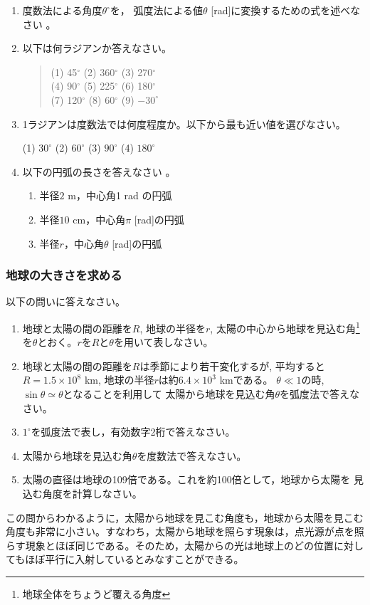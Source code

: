 \documentclass[twocolumn,11pt]{jarticle}
\begin{document}
\begin{enumerate}
\item 度数法による角度$\theta^\circ$を，
  弧度法による値$\theta$ [rad]に変換するための式を述べなさい
。
\item 以下は何ラジアンか答えなさい。
  \begin{quote}
    (1) 45$^\circ$\quad
    (2) 360$^\circ$\quad
    (3) 270$^\circ$\\
    (4) 90$^\circ$\quad
    (5) 225$^\circ$\quad
    (6) 180$^\circ$\\
    (7) 120$^\circ$\quad
    (8) 60$^\circ$\quad
    (9) $-30^\circ$\quad
  \end{quote}
\item 1ラジアンは度数法では何度程度か。以下から最も近い値を選びなさい。
  \begin{center}
    (1) $30^\circ$\quad
    (2) $60^\circ$\quad
    (3) $90^\circ$\quad
    (4) $180^\circ$
  \end{center}
\item 以下の円弧の長さを答えなさい
。
  \begin{enumerate}
  \item\label{citem:2m1rad} 半径$2$ m，中心角1 rad の円弧
  \item\label{citem:10cmPIrad} 半径$10$ cm，中心角$\pi$ [rad]の円弧
  \item\label{citem:rtheta} 半径$r$，中心角$\theta$ [rad]の円弧
  \end{enumerate}
\end{enumerate}

\subsubsection{地球の大きさを求める}
\nquestion 以下の問いに答えなさい。
\begin{enumerate}
\item 地球と太陽の間の距離を$R$, 地球の半径を$r$, 太陽の中心から地球を見込む角\footnote{地球全体をちょうど覆える角度}を$\theta$とおく。$r$を$R$と$\theta$を用いて表しなさい。
\item 地球と太陽の間の距離を$R$は季節により若干変化するが, 平均すると
  $R=1.5\times 10^8$ km, 地球の半径$r$は約$6.4\times 10^3$ kmである。
  $\theta \ll 1$の時, $\sin \theta \simeq \theta$となることを利用して
  太陽から地球を見込む角$\theta$を弧度法で答えなさい。
\item $1^{\circ}$を弧度法で表し，有効数字2桁で答えなさい。
\item 太陽から地球を見込む角$\theta$を度数法で答えなさい。
\item 太陽の直径は地球の109倍である。これを約100倍として，地球から太陽を
見込む角度を計算しなさい。
\end{enumerate}
この問からわかるように，太陽から地球を見こむ角度も，地球から太陽を見こむ角度も非常に小さい。すなわち，太陽から地球を照らす現象は，点光源が点を照らす現象とほぼ同じである。そのため，太陽からの光は地球上のどの位置に対してもほぼ平行に入射しているとみなすことができる。
\end{document}
